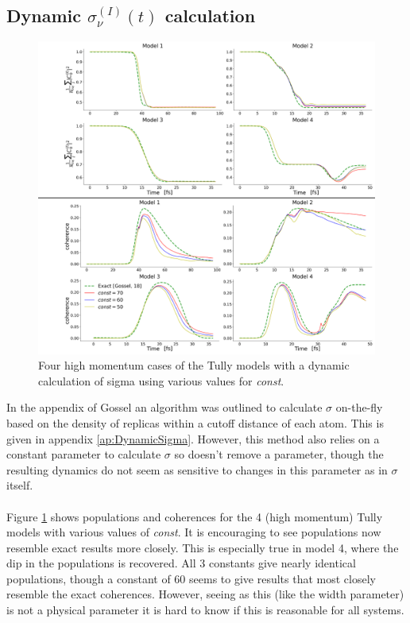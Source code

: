 \subsection{Dynamic $\sigma^{(I)}_{\nu}(t)$ calculation}
\begin{figure}[ht]
  \includegraphics[width=\textwidth]{../img/CTMQC/TullyModels/CTMQC_dynSig_highMom.png}
	\caption{\label{fig:dynamicSigma}Four high momentum cases of the Tully models with a dynamic calculation of sigma using various values for \textit{const}.}
\end{figure}
In the appendix of Gossel \cite{gossel_coupled-trajectory_2018} an algorithm was outlined to calculate $\sigma$ on-the-fly based on the density of replicas within a cutoff distance of each atom. This is given in appendix \ref{ap:DynamicSigma}. However, this method also relies on a constant parameter to calculate $\sigma$ so doesn't remove a parameter, though the resulting dynamics do not seem as sensitive to changes in this parameter as in $\sigma$ itself.
\\\\
Figure \ref{fig:dynamicSigma} shows populations and coherences for the 4 (high momentum) Tully models with various values of \textit{const}. It is encouraging to see populations now resemble exact results more closely. This is especially true in model 4, where the dip in the populations is recovered. All 3 constants give nearly identical populations, though a constant of 60 seems to give results that most closely resemble the exact coherences. However, seeing as this (like the width parameter) is not a physical parameter it is hard to know if this is reasonable for all systems. 
